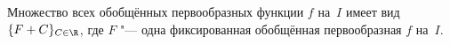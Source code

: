 
  Множество всех обобщённых первообразных функции $f$ на~$I$ имеет вид $\{F+C\}_{C\in\R}$, где $F$ "--- одна фиксированная обобщённая первообразная $f$ на~$I$.
